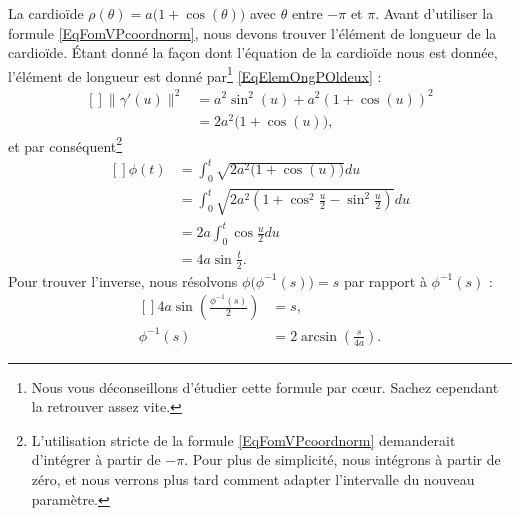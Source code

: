 \begin{example}
	La cardioïde \( \rho(\theta)=a\big(1+\cos(\theta)\big)\) avec \( \theta\) entre \( -\pi\) et \( \pi\). Avant d'utiliser la formule \eqref{EqFomVPcoordnorm}, nous devons trouver l'élément de longueur de la cardioïde. Étant donné la façon dont l'équation de la cardioïde nous est donnée, l'élément de longueur est donné par\footnote{Nous vous déconseillons d'étudier cette formule par cœur. Sachez cependant la retrouver assez vite.} \eqref{EqElemOngPOldeux} :
	\begin{equation}
		\begin{aligned}[]
			\| \gamma'(u) \|^2 & =a^2\sin^2(u)+a^2(1+\cos(u))^2 \\
			                   & =2a^2\big( 1+\cos(u) \big),
		\end{aligned}
	\end{equation}
	et par conséquent\footnote{L'utilisation stricte de la formule \eqref{EqFomVPcoordnorm} demanderait d'intégrer à partir de \( -\pi\). Pour plus de simplicité, nous intégrons à partir de zéro, et nous verrons plus tard comment adapter l'intervalle du nouveau paramètre.}
	\begin{equation}
		\begin{aligned}[]
			\phi(t) & =\int_0^t\sqrt{2a^2\big( 1+\cos(u) \big)}du                                    \\
			        & =\int_0^t\sqrt{2a^2\left( 1+\cos^2\frac{ u }{2}-\sin^2\frac{ u }{2} \right)}du \\
			        & =2a\int_0^t\cos\frac{ u }{2}du                                                 \\
			        & =4a\sin\frac{ t }{2}.
		\end{aligned}
	\end{equation}
	Pour trouver l'inverse, nous résolvons \( \phi\big( \phi^{-1}(s) \big)=s\) par rapport à \( \phi^{-1}(s)\) :
	\begin{equation}
		\begin{aligned}[]
			4a\sin\left( \frac{ \phi^{-1}(s) }{2} \right) & =s,                                       \\
			\phi^{-1}(s)                                  & =2\arcsin\left( \frac{ s }{ 4a } \right).
		\end{aligned}
	\end{equation}


\end{example}
